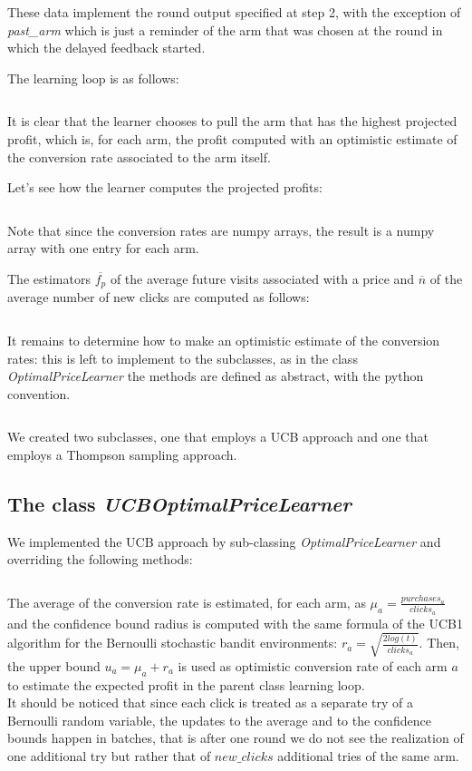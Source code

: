 \documentclass[11pt]{article} %
\begin{document}
These data implement the round output specified at step 2, with the exception of \textit{past\_arm} which is just a reminder of the arm that was chosen at the round in which the delayed feedback started. 

The learning loop is as follows:
\inputminted{python}{code/step3_learning_loop.py}
It is clear that the learner chooses to pull the arm that has the highest projected profit, which is, for each arm, the profit computed with an optimistic estimate of the conversion rate associated to the arm itself.

Let's see how the learner computes the projected profits:
\inputminted{python}{code/step3_projected_profits.py}
Note that since the conversion rates are numpy arrays, the result is a numpy array with one entry for each arm.

The estimators $\overline{f_p}$ of the average future visits associated with a price and $\overline{n}$ of the average number of new clicks are computed as follows:
\inputminted{python}{code/step3_estimates.py}
It remains to determine how to make an optimistic estimate of the conversion rates: this is left to implement to the subclasses, as in the class \textit{OptimalPriceLearner} the methods are defined as abstract, with the python convention.
\inputminted{python}{code/step3_conversion_rates.py}
We created two subclasses, one that employs a UCB approach and one that employs a Thompson sampling approach.\\

\begin{samepage}
\subsection{The class \textit{UCBOptimalPriceLearner}}
We implemented the UCB approach by sub-classing  \textit{OptimalPriceLearner} and overriding the following methods:
\inputminted{python}{code/step3_ucb.py}
\end{samepage}
The average of the conversion rate is estimated, for each arm, as $\mu_a=\frac{purchases_a}{clicks_a}$ and the confidence bound radius is computed with the same formula of the UCB1 algorithm for the Bernoulli stochastic bandit environments: $r_a=\sqrt{\frac{2log(t)}{clicks_a}}$.
Then, the upper bound $u_a = \mu_a+r_a$ is used as optimistic conversion rate of each arm $a$ to estimate the expected profit in the parent class learning loop.\\

It should be noticed that since each click is treated as a separate try of a Bernoulli random variable, the updates to the average and to the confidence bounds happen in batches, that is after one round we do not see the realization of one additional try but rather that of $new\_clicks$ additional tries of the same arm.\\
\end{document}
